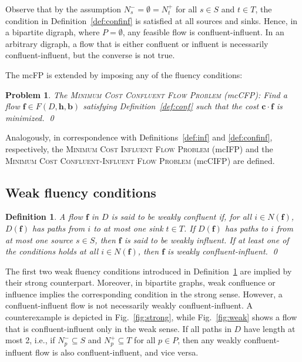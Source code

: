 \documentclass[pdflatex,sn-mathphys-num]{sn-jnl}%
\theoremstyle{thmstyleone}%
\newtheorem{definition}[theorem]{Definition}%
\newtheorem{problem}[theorem]{Problem}%
\begin{document}
Observe that by the assumption $N_s^-=\emptyset=N_t^+$ for all $s\in S$ and $t\in T$,
the condition in Definition~\ref{def:confinf} is satisfied at all sources and sinks.
Hence, in a bipartite digraph, where $P=\emptyset$, any feasible flow is confluent-influent.
In an arbitrary digraph, a flow that is either confluent or influent is necessarily confluent-influent, but the converse is not true.

The mcFP is extended by imposing any of the fluency conditions:
\begin{problem} \label{prob:conf}
The \textsc{Minimum Cost Confluent Flow Problem} (mcCFP):
Find a flow $\boldsymbol{f}\in F(D,\boldsymbol{h},\boldsymbol{b})$ satisfying Definition~\ref{def:conf} such that the cost $\boldsymbol{c}\cdot\boldsymbol{f}$ is minimized.
\qed
\end{problem}
\noindent
Analogously, in correspondence with Definitions~\ref{def:inf} and \ref{def:confinf}, respectively, the 
\textsc{Minimum Cost Influent Flow Problem} (mcIFP) and the \textsc{Minimum Cost Confluent-Influent Flow Problem} (mcCIFP) are defined.

\subsection{Weak fluency conditions} \label{sec:weak}


\begin{definition} \label{def:weakconfinf}
A flow $\boldsymbol{f}$ in $D$ is said to be \emph{weakly confluent} if, for all $i\in N(\boldsymbol{f})$,
$D(\boldsymbol{f})$ has paths from $i$ to at most one sink $t\in T$.
If $D(\boldsymbol{f})$ has paths to $i$ from at most one source $s\in S$, then $\boldsymbol{f}$ is said to be \emph{weakly influent}.
If at least one of the conditions holds at all $i\in N(\boldsymbol{f})$, then $\boldsymbol{f}$ is \emph{weakly confluent-influent}.
\qed
\end{definition}

The first two weak fluency conditions introduced in Definition~\ref{def:weakconfinf} are implied by their strong counterpart. Moreover, in bipartite graphs, weak confluence or influence implies the corresponding condition in the strong sense.
However, a confluent-influent flow is not necessarily weakly confluent-influent. A counterexample is depicted in Fig.~\ref{fig:strong}, while Fig.~\ref{fig:weak} shows a flow that is confluent-influent only in the weak sense.
If all paths in $D$ have length at most 2, i.e., if $N_p^-\subseteq S$ and $N_p^+\subseteq T$ for all $p\in P$, then any weakly confluent-influent flow is also confluent-influent, and vice versa.
\end{document}
